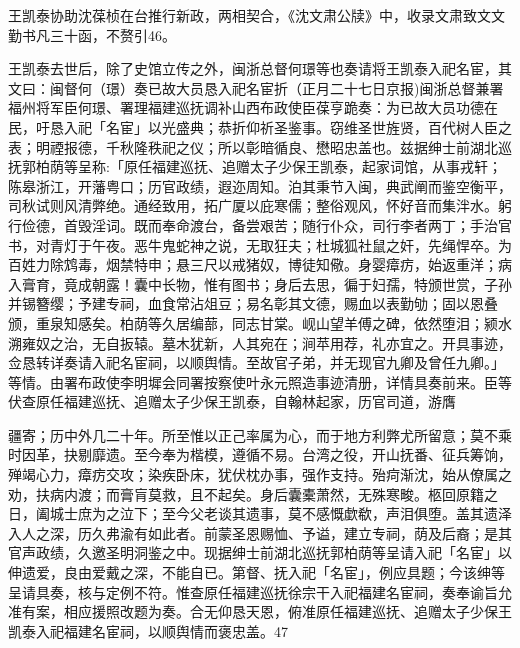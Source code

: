 王凯泰协助沈葆桢在台推行新政，两相契合，《沈文肃公牍》中，收录文肃致文文勤书凡三十函，不赘引46。

王凯泰去世后，除了史馆立传之外，闽浙总督何璟等也奏请将王凯泰入祀名宦，其文曰：闽督何（璟）奏已故大员恳入祀名宦折（正月二十七日京报)闽浙总督兼署福州将军臣何璟、署理福建巡抚调补山西布政使臣葆亨跪奏：为已故大员功德在民，吁恳入祀「名宦」以光盛典；恭折仰祈圣鉴事。窃维圣世旌贤，百代树人臣之表；明禋报德，千秋隆秩祀之仪；所以彰暗循良、懋昭忠盖也。兹据绅士前湖北巡抚郭柏荫等呈称:「原任福建巡抚、追赠太子少保王凯泰，起家词馆，从事戎轩；陈皋浙江，开藩粤口；历官政绩，遐迩周知。泊其秉节入闽，典武阐而鉴空衡平，司秋试则风清弊绝。通经致用，拓广厦以庇寒儒；整俗观风，怀好音而集泮水。躬行俭德，首毁淫词。既而奉命渡台，备尝艰苦；随行仆众，司行李者两丁；手治官书，对青灯于午夜。恶牛鬼蛇神之说，无取狂夫；杜城狐社鼠之奸，先绳悍卒。为百姓力除鸩毒，烟禁特申；悬三尺以戒猪奴，博徒知儆。身婴瘴疠，始返重洋；病入膏育，竟成朝露！囊中长物，惟有图书；身后去思，徧于妇孺，特颁世赏，子孙并锡簪缨；予建专祠，血食常沾俎豆；易名彰其文德，赐血以表勤劬；固以恩叠颁，重泉知感矣。柏荫等久居编蔀，同志甘棠。岘山望羊傅之碑，依然堕泪；颍水溯雍奴之治，无自扳辕。墓木犹新，人其宛在；涧苹用荐，礼亦宜之。开具事迹，佥恳转详奏请入祀名宦祠，以顺舆情。至故官子弟，并无现官九卿及曾任九卿。」等情。由署布政使李明墀会同署按察使叶永元照造事迹清册，详情具奏前来。臣等伏查原任福建巡抚、追赠太子少保王凯泰，自翰林起家，历官司道，游膺

\vfill
\begin{BookNotes}
\end{BookNotes}

\begin{BookQuote}
疆寄；历中外几二十年。所至惟以正己率属为心，而于地方利弊尤所留意；莫不乘时因革，抉剔靡遗。至今奉为楷模，遵循不易。台湾之役，开山抚番、征兵筹饷，殚竭心力，瘴疠交攻；染疾卧床，犹伏枕办事，强作支持。殆疴渐沈，始从僚属之劝，扶病内渡；而膏肓莫救，且不起矣。身后囊橐萧然，无殊寒畯。柩回原籍之日，阖城士庶为之泣下；至今父老谈其遗事，莫不感慨歔欷，声泪俱堕。盖其遗泽入人之深，历久弗渝有如此者。前蒙圣恩赐恤、予谥，建立专祠，荫及后裔；是其官声政绩，久邀圣明洞鉴之中。现据绅士前湖北巡抚郭柏荫等呈请入祀「名宦」以伸遗爱，良由爱戴之深，不能自已。第督、抚入祀「名宦」，例应具题；今该绅等呈请具奏，核与定例不符。惟查原任福建巡抚徐宗干入祀福建名宦祠，奏奉谕旨允准有案，相应援照改题为奏。合无仰恳天恩，俯准原任福建巡抚、追赠太子少保王凯泰入祀福建名宦祠，以顺舆情而褒忠盖。47
\end{BookQuote}

